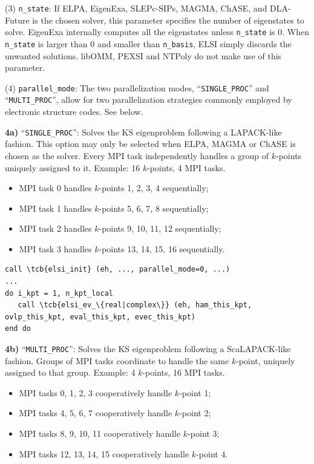 \documentclass{report}
\newcommand{\tcb}[1]{\textcolor{blue}{#1}}
\begin{document}
(3) \texttt{n\_state}: If ELPA, EigenExa, SLEPc-SIPs, MAGMA, ChASE, and DLA-Future is the chosen solver, this parameter specifies the number of eigenstates to solve. EigenExa internally computes all the eigenstates unless \texttt{n\_state} is 0. When \texttt{n\_state} is larger than 0 and smaller than \texttt{n\_basis}, ELSI simply discards the unwanted solutions. libOMM, PEXSI and NTPoly do not make use of this parameter.

(4) \texttt{parallel\_mode}: The two parallelization modes, ``\texttt{SINGLE\_PROC}'' and ``\texttt{MULTI\_PROC}'', allow for two parallelization strategies commonly employed by electronic structure codes. See below.

\textbf{4a)} ``\texttt{SINGLE\_PROC}'': Solves the KS eigenproblem following a LAPACK-like fashion. This option may only be selected when ELPA, MAGMA or ChASE is chosen as the solver. Every MPI task independently handles a group of $k$-points uniquely assigned to it. Example: 16 $k$-points, 4 MPI tasks.
\begin{itemize}
\item MPI task 0 handles $k$-points 1, 2, 3, 4 sequentially;
\item MPI task 1 handles $k$-points 5, 6, 7, 8 sequentially;
\item MPI task 2 handles $k$-points 9, 10, 11, 12 sequentially;
\item MPI task 3 handles $k$-points 13, 14, 15, 16 sequentially.
\end{itemize}

\begin{tcolorbox}
\begin{Verbatim}[commandchars=\\\{\}]
call \tcb{elsi_init} (eh, ..., parallel_mode=0, ...)
...
do i_kpt = 1, n_kpt_local
   call \tcb{elsi_ev_\{real|complex\}} (eh, ham_this_kpt, ovlp_this_kpt, eval_this_kpt, evec_this_kpt)
end do
\end{Verbatim}
\end{tcolorbox}

\textbf{4b)} ``\texttt{MULTI\_PROC}'': Solves the KS eigenproblem following a ScaLAPACK-like fashion. Groups of MPI tasks coordinate to handle the same $k$-point, uniquely assigned to that group. Example: 4 $k$-points, 16 MPI tasks.
\begin{itemize}
\item MPI tasks 0, 1, 2, 3 cooperatively handle $k$-point 1;
\item MPI tasks 4, 5, 6, 7 cooperatively handle $k$-point 2;
\item MPI tasks 8, 9, 10, 11 cooperatively handle $k$-point 3;
\item MPI tasks 12, 13, 14, 15 cooperatively handle $k$-point 4.
\end{itemize}
\end{document}
